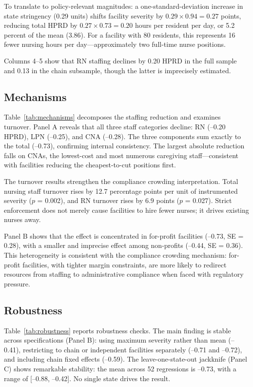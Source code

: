 \documentclass[12pt]{article}
\begin{document}
To translate to policy-relevant magnitudes: a one-standard-deviation increase in state stringency (0.29 units) shifts facility severity by $0.29 \times 0.94 = 0.27$ points, reducing total HPRD by $0.27 \times 0.73 = 0.20$ hours per resident per day, or 5.2 percent of the mean (3.86). For a facility with 80 residents, this represents 16 fewer nursing hours per day---approximately two full-time nurse positions.

Columns 4--5 show that RN staffing declines by 0.20 HPRD in the full sample and 0.13 in the chain subsample, though the latter is imprecisely estimated.

\subsection{Mechanisms}



Table~\ref{tab:mechanisms} decomposes the staffing reduction and examines turnover. Panel A reveals that all three staff categories decline: RN (--0.20 HPRD), LPN (--0.25), and CNA (--0.28). The three components sum exactly to the total (--0.73), confirming internal consistency. The largest absolute reduction falls on CNAs, the lowest-cost and most numerous caregiving staff---consistent with facilities reducing the cheapest-to-cut positions first.

The turnover results strengthen the compliance crowding interpretation. Total nursing staff turnover rises by 12.7 percentage points per unit of instrumented severity ($p$ = 0.002), and RN turnover rises by 6.9 points ($p$ = 0.027). Strict enforcement does not merely cause facilities to hire fewer nurses; it drives existing nurses away.

Panel B shows that the effect is concentrated in for-profit facilities (--0.73, SE = 0.28), with a smaller and imprecise effect among non-profits (--0.44, SE = 0.36). This heterogeneity is consistent with the compliance crowding mechanism: for-profit facilities, with tighter margin constraints, are more likely to redirect resources from staffing to administrative compliance when faced with regulatory pressure.

\subsection{Robustness}



Table~\ref{tab:robustness} reports robustness checks. The main finding is stable across specifications (Panel B): using maximum severity rather than mean (--0.41), restricting to chain or independent facilities separately (--0.71 and --0.72), and including chain fixed effects (--0.59). The leave-one-state-out jackknife (Panel C) shows remarkable stability: the mean across 52 regressions is --0.73, with a range of [--0.88, --0.42]. No single state drives the result.
\end{document}
